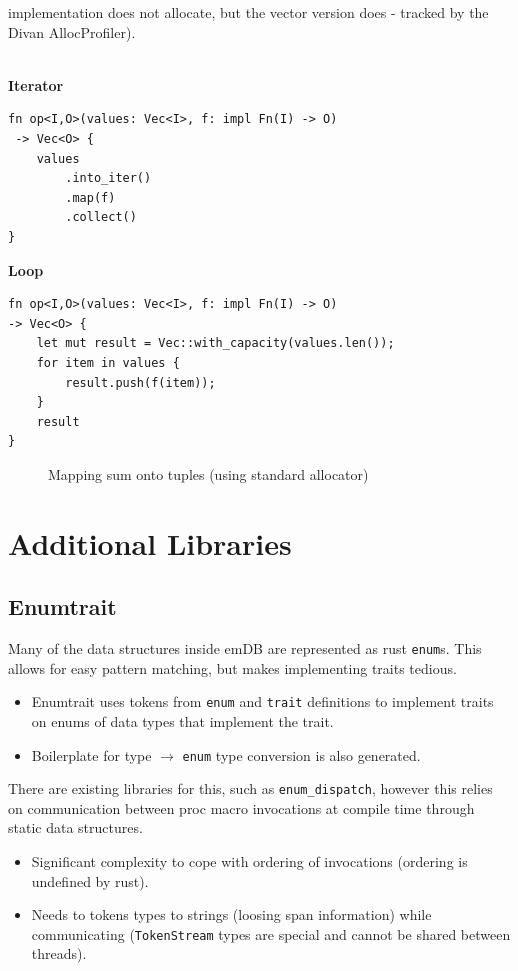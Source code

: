 implementation does not allocate, but the vector version does - tracked by the Divan AllocProfiler).
\\
\\ \begin{minipage}{.5\textwidth}
    \textbf{Iterator}
    \begin{verbatim}
fn op<I,O>(values: Vec<I>, f: impl Fn(I) -> O)
 -> Vec<O> {
    values
        .into_iter()
        .map(f)
        .collect()
}

    \end{verbatim}
\end{minipage} \hfill \begin{minipage}{.5\textwidth}
    \textbf{Loop}
    \begin{verbatim}
fn op<I,O>(values: Vec<I>, f: impl Fn(I) -> O) 
-> Vec<O> {
    let mut result = Vec::with_capacity(values.len());
    for item in values {
        result.push(f(item));
    }
    result
}
    \end{verbatim}
\end{minipage}

\begin{figure}[h!]
    \centering
    \vspace{-0.4em}
    \resizebox{\textwidth}{!}{}
    \caption{Mapping sum onto tuples (using standard allocator)}
\end{figure}

\section{Additional Libraries}
\subsection{Enumtrait}
Many of the data structures inside emDB are represented as rust \texttt{enum}s.
This allows for easy pattern matching, but makes implementing traits tedious.
\begin{itemize}
    \setlength\itemsep{0em}
    \item Enumtrait uses tokens from \texttt{enum} and \texttt{trait} definitions to implement traits on enums of data types that implement the trait.
    \item Boilerplate for type $\to$ \texttt{enum} type conversion is also generated.
\end{itemize}
There are existing libraries for this, such as \texttt{enum_dispatch}, however this relies on
communication between proc macro invocations at compile time through static data structures.
\begin{itemize}
    \setlength\itemsep{0em}
    \item Significant complexity to cope with ordering of invocations (ordering is undefined by rust).
    \item Needs to tokens types to strings (loosing span information) while communicating (\texttt{TokenStream} types are special and cannot be shared between threads).
\end{itemize}


